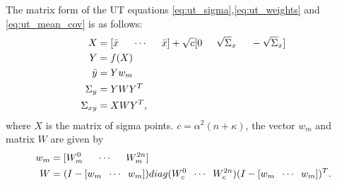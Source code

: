 The matrix form of the UT equations \ref{eq:ut_sigma},\ref{eq:ut_weights} and \ref{eq:ut_mean_cov} is as follows:
\begin{equation}
        \begin{split}
            X &= [ \bar x \hspace{5mm} \cdots \hspace{5mm} \bar x ]+ \sqrt c [ 0 \hspace{5mm} \sqrt \Sigma_x \hspace{5mm} - \sqrt \Sigma_x ]\\
            Y &= f(X) \\
            \bar y &= Y w_m\\
            \Sigma_y &= Y W Y^T \\
            \Sigma_{xy} &= X W Y^T,
        \end{split}
    \end{equation}
    where $X$ is the matrix of sigma points. $c=\alpha^2(n+\kappa)$, the vector $w_m$ and matrix $W$ are given by
    \begin{equation}
        \begin{split}
        w_m &= [W_m^0 \hspace{5mm} \cdots \hspace{5mm} W_m^{2n} ]\\
        W &= (I-[w_m \hspace{2mm} \cdots \hspace{2mm} w_m])diag(W_c^0 \hspace{2mm} \cdots \hspace{2mm} W_c^{2n}) (I-[w_m \hspace{2mm} \cdots \hspace{2mm} w_m])^T.
        \end{split}
    \end{equation}

